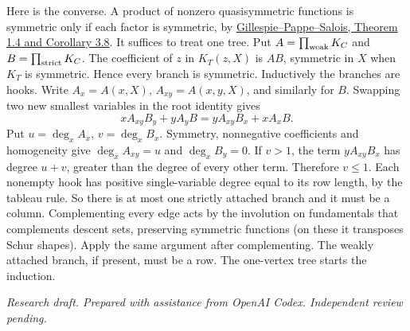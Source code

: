 \documentclass[11pt]{article}
\begin{document}
Here is the converse. A product of nonzero quasisymmetric functions is symmetric only if each factor is symmetric, by \href{https://doi.org/10.5802/alco.448}{Gillespie--Pappe--Salois, Theorem 1.4 and Corollary 3.8}. It suffices to treat one tree. Put $A=\prod_{\rm weak}K_C$ and $B=\prod_{\rm strict}K_C$. The coefficient of $z$ in $K_T(z,X)$ is $AB$, symmetric in $X$ when $K_T$ is symmetric. Hence every branch is symmetric. Inductively the branches are hooks. Write $A_x=A(x,X)$, $A_{xy}=A(x,y,X)$, and similarly for $B$. Swapping two new smallest variables in the root identity gives
\[
 x A_{xy}B_y+yA_y B = y A_{xy}B_x+x A_x B.
\]
Put $u=\deg_x A_x$, $v=\deg_x B_x$. Symmetry, nonnegative coefficients and homogeneity give $\deg_x A_{xy}=u$ and $\deg_x B_y=0$. If $v>1$, the term $yA_{xy}B_x$ has degree $u+v$, greater than the degree of every other term. Therefore $v\le1$. Each nonempty hook has positive single-variable degree equal to its row length, by the tableau rule. So there is at most one strictly attached branch and it must be a column. Complementing every edge acts by the involution on fundamentals that complements descent sets, preserving symmetric functions (on these it transposes Schur shapes). Apply the same argument after complementing. The weakly attached branch, if present, must be a row. The one-vertex tree starts the induction.

\medskip\noindent\textit{Research draft. Prepared with assistance from OpenAI Codex. Independent review pending.}
\end{document}
